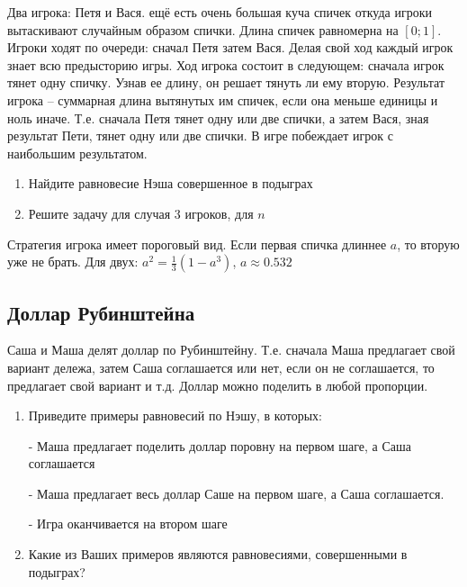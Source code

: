 \begin{problem}
Два игрока: Петя и Вася. ещё есть очень большая куча спичек откуда игроки вытаскивают случайным образом спички. Длина спичек равномерна на $[0;1]$. Игроки ходят по очереди: сначал Петя затем Вася. Делая свой ход каждый игрок знает всю предысторию игры. Ход игрока состоит в следующем: сначала игрок тянет одну спичку. Узнав ее длину, он решает тянуть ли ему вторую. Результат игрока -- суммарная длина вытянутых им спичек, если она меньше единицы и ноль иначе. Т.е. сначала Петя тянет одну или две спички, а затем Вася, зная результат Пети, тянет одну или две спички. В игре побеждает игрок с наибольшим результатом.
\begin{enumerate}
\item Найдите равновесие Нэша совершенное в подыграх
\item Решите задачу для случая 3 игроков, для $n$
\end{enumerate}




\begin{sol}
Стратегия игрока имеет пороговый вид. Если первая спичка длиннее $a$, то вторую уже не брать. Для двух: $a^{2}=\frac{1}{3}(1-a^{3})$, $a\approx 0.532$
\end{sol}
\end{problem}






\subsection{Доллар Рубинштейна}

\begin{problem}
Саша и Маша делят доллар по Рубинштейну. Т.е. сначала Маша предлагает свой вариант дележа, затем Саша соглашается или нет, если он не соглашается, то предлагает свой вариант и т.д. Доллар можно поделить в любой пропорции.\par

\begin{enumerate}
\item  Приведите примеры равновесий по Нэшу, в которых:\par
- Маша предлагает поделить доллар поровну на первом шаге, а Саша соглашается\par
- Маша предлагает весь доллар Саше на первом шаге, а Саша соглашается.\par
- Игра оканчивается на втором шаге\par
\item Какие из Ваших примеров являются равновесиями, совершенными в подыграх?
\end{enumerate}


\begin{sol}

\end{sol}
\end{problem}



